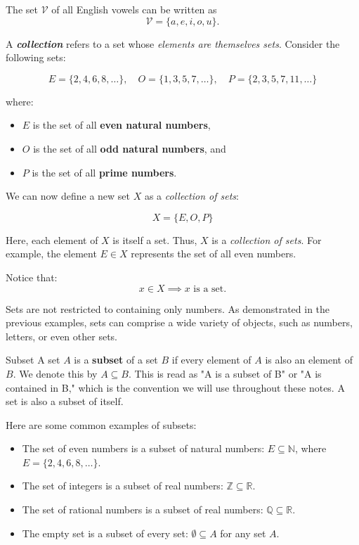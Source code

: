\begin{example}
The set \(\mathcal{V}\) of all English vowels can be written as
\[
\mathcal{V} = \{a, e, i, o, u\}.
\]
\end{example}

\begin{example}
A \textbf{\textit{collection}} refers to a set whose \textit{elements are themselves sets}. Consider the following sets:

\[
E = \{2, 4, 6, 8, \dots\}, \quad O = \{1, 3, 5, 7, \dots\}, \quad P = \{2, 3, 5, 7, 11, \dots\}
\]

where:
\begin{itemize}
    \item \(E\) is the set of all \textbf{even natural numbers},
    \item \(O\) is the set of all \textbf{odd natural numbers}, and
    \item \(P\) is the set of all \textbf{prime numbers}.
\end{itemize}

We can now define a new set \(X\) as a \textit{collection of sets}:

\[
X = \{E, O, P\}
\]

Here, each element of \(X\) is itself a set. Thus, \(X\) is a \textit{collection of sets}. For example, the element \(E \in X\) represents the set of all even numbers.

Notice that:
\[
x \in X \implies x \text{ is a set}.
\]

Sets are not restricted to containing only numbers. As demonstrated in the previous examples, sets can comprise a wide variety of objects, such as numbers, letters, or even other sets.

\end{example}

\begin{definitionbox}{Subset}
A set \(A\) is a \textbf{subset} of a set \(B\) if every element of \(A\) is also an element of \(B\). We denote this by \(A \subseteq B\). This is read as "A is a subset of B" or "A is contained in B," which is the convention we will use throughout these notes. A set is also a subset of itself.  
\end{definitionbox}

\begin{example}
Here are some common examples of subsets:
\begin{itemize}
    \item The set of even numbers is a subset of natural numbers: \(E \subseteq \mathbb{N}\), where \(E = \{2, 4, 6, 8, \dots\}\).
    \item The set of integers is a subset of real numbers: \(\mathbb{Z} \subseteq \mathbb{R}\).
    \item The set of rational numbers is a subset of real numbers: \(\mathbb{Q} \subseteq \mathbb{R}\).
    \item The empty set is a subset of every set: \(\emptyset \subseteq A\) for any set \(A\).
\end{itemize}
\end{example}

